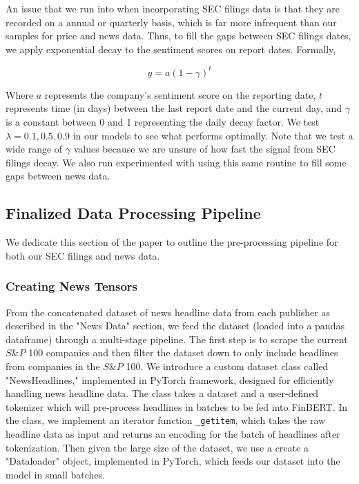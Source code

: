An issue that we run into when incorporating SEC filings data is that they are recorded on a annual or quarterly basis, which is far more infrequent than our samples for price and news data.
Thus, to fill the gaps between SEC filings dates, we apply exponential decay to the sentiment scores on report dates. Formally,

$$
y = a(1 - \gamma)^t
$$

Where $a$ represents the company's sentiment score on the reporting date, $t$ represents time (in days) between the last report date and the current day, and $\gamma$ is a constant between 0 and 1 representing the daily decay factor. We test $\lambda = 0.1, 0.5, 0.9$ in our models to see what performs optimally. Note that we test a wide range of $\gamma$ values because we are unsure of how fast the signal from SEC filings decay. We also run experimented with using this same routine to fill some gaps between news data.
 
\subsection{Finalized Data Processing Pipeline}
We dedicate this section of the paper to outline the pre-processing pipeline for both our SEC filings and news data.

\subsubsection{Creating News Tensors}\label{newstensors}

From the concatenated dataset of news headline data from each publisher as described in the "News Data" section, we feed the dataset (loaded into a pandas dataframe) through a multi-stage pipeline. 
The first step is to scrape the current $S\&P$ 100 companies and then filter the dataset down to only include headlines from companies in the $S\&P$ 100. 
We introduce a custom dataset class called "NewsHeadlines," implemented in PyTorch framework, designed for efficiently handling news headline data. 
The class takes a dataset and a user-defined tokenizer which will pre-process headlines in batches to be fed into FinBERT. 
In the class, we implement an iterator function \texttt{\_getitem}, which takes the raw headline data as input and returns an encoding for the batch of headlines after tokenization. 
Then given the large size of the dataset, we use a create a "Dataloader" object, implemented in PyTorch, which feeds our dataset into the model in small batches. 

